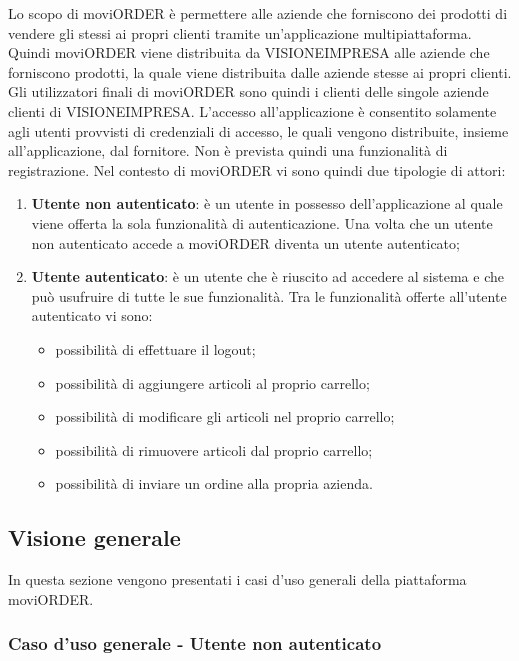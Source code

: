 Lo scopo di moviORDER è permettere alle aziende che forniscono dei prodotti di vendere gli stessi ai propri clienti tramite un'applicazione multipiattaforma. Quindi moviORDER viene distribuita da VISIONEIMPRESA alle aziende che forniscono prodotti, la quale viene distribuita dalle aziende stesse ai propri clienti. Gli utilizzatori finali di moviORDER sono quindi i clienti delle singole aziende clienti di VISIONEIMPRESA.
L'accesso all'applicazione è consentito solamente agli utenti provvisti di credenziali di accesso, le quali vengono distribuite, insieme all'applicazione, dal fornitore. Non è prevista quindi una funzionalità di registrazione. Nel contesto di moviORDER vi sono quindi due tipologie di attori:
\begin{enumerate}
	\item \textbf{Utente non autenticato}: è un utente in possesso dell'applicazione al quale viene offerta la sola funzionalità di autenticazione. Una volta che un utente non autenticato accede a moviORDER diventa un utente autenticato;
	\item \textbf{Utente autenticato}: è un utente che è riuscito ad accedere al sistema e che può usufruire di tutte le sue funzionalità. Tra le funzionalità offerte all'utente autenticato vi sono:
	\begin{itemize}
		\item possibilità di effettuare il logout;
		\item possibilità di aggiungere articoli al proprio carrello;
		\item possibilità di modificare gli articoli nel proprio carrello;
		\item possibilità di rimuovere articoli dal proprio carrello;
		\item possibilità di inviare un ordine alla propria azienda.
	\end{itemize}
\end{enumerate}

\subsection{Visione generale}

In questa sezione vengono presentati i casi d'uso generali della piattaforma moviORDER.

\subsubsection{Caso d'uso generale - Utente non autenticato}

